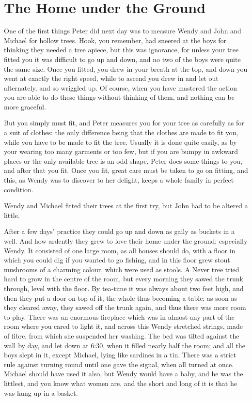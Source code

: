 
\chapter{The Home under the Ground}

One of the first things Peter did next day was to measure Wendy and John and Michael for hollow trees.
Hook, you remember, had sneered at the boys for thinking they needed a tree apiece,
but this was ignorance, for unless your tree fitted you it was difficult to go up and down,
and no two of the boys were quite the same size.
Once you fitted, you drew in your breath at the top, and down you went at exactly the right speed,
while to ascend you drew in and let out alternately, and so wriggled up.
Of course, when you have mastered the action you are able to do these things without thinking of them,
and nothing can be more graceful.

But you simply must fit, and Peter measures you for your tree as carefully as for a suit of clothes:
the only difference being that the clothes are made to fit you, while you have to be made to fit the tree.
Usually it is done quite easily, as by your wearing too many garments or too few,
but if you are bumpy in awkward places or the only available tree is an odd shape,
Peter does some things to you, and after that you fit.
Once you fit, great care must be taken to go on fitting,
and this, as Wendy was to discover to her delight, keeps a whole family in perfect condition.

Wendy and Michael fitted their trees at the first try, but John had to be altered a little.

After a few days’ practice they could go up and down as gaily as buckets in a well.
And how ardently they grew to love their home under the ground;
especially Wendy.
It consisted of one large room, as all houses should do,
with a floor in which you could dig if you wanted to go fishing,
and in this floor grew stout mushrooms of a charming colour, which were used as stools.
A Never tree tried hard to grow in the centre of the room,
but every morning they sawed the trunk through, level with the floor.
By tea‐time it was always about two feet high, and then they put a door on top of it,
the whole thus becoming a table;
as soon as they cleared away, they sawed off the trunk again, and thus there was more room to play.
There was an enormous fireplace which was in almost any part of the room where you cared to light it,
and across this Wendy stretched strings, made of fibre, from which she suspended her washing.
The bed was tilted against the wall by day, and let down at 6:30, when it filled nearly half the room;
and all the boys slept in it, except Michael, lying like sardines in a tin.
There was a strict rule against turning round until one gave the signal, when all turned at once.
Michael should have used it also, but Wendy would have a baby, and he was the littlest,
and you know what women are, and the short and long of it is that he was hung up in a basket.

